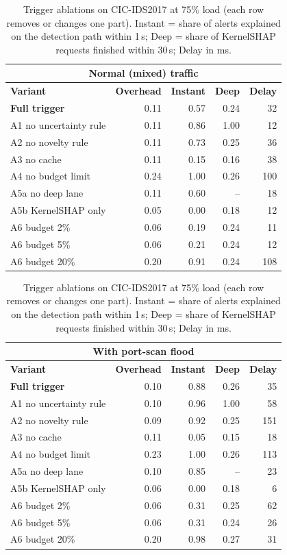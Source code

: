 \begin{table}[!htbp]
\centering
\caption{Trigger ablations on CIC-IDS2017 at 75\% load (each row removes or changes one part). Instant = share of alerts explained on the detection path within 1\,s; Deep = share of KernelSHAP requests finished within 30\,s; Delay in ms.}
\label{tab:abl}
\scriptsize
\setlength{\tabcolsep}{3pt}
\begin{minipage}[t]{0.495\textwidth}
\centering
\begin{tabular}{lrrrr}
\toprule
\multicolumn{5}{c}{\textbf{Normal (mixed) traffic}} \\
\midrule
\textbf{Variant} & \textbf{Overhead} & \textbf{Instant} & \textbf{Deep} & \textbf{Delay} \\
\midrule
\textbf{Full trigger} & 0.11 & 0.57 & 0.24 & 32 \\
A1 no uncertainty rule & 0.11 & 0.86 & 1.00 & 12 \\
A2 no novelty rule & 0.11 & 0.73 & 0.25 & 36 \\
A3 no cache & 0.11 & 0.15 & 0.16 & 38 \\
A4 no budget limit & 0.24 & 1.00 & 0.26 & 100 \\
A5a no deep lane & 0.11 & 0.60 & -- & 18 \\
A5b KernelSHAP only & 0.05 & 0.00 & 0.18 & 12 \\
A6 budget 2\% & 0.06 & 0.19 & 0.24 & 11 \\
A6 budget 5\% & 0.06 & 0.21 & 0.24 & 12 \\
A6 budget 20\% & 0.20 & 0.91 & 0.24 & 108 \\
\bottomrule
\end{tabular}
\end{minipage}
\hfill
\begin{minipage}[t]{0.495\textwidth}
\centering
\begin{tabular}{lrrrr}
\toprule
\multicolumn{5}{c}{\textbf{With port-scan flood}} \\
\midrule
\textbf{Variant} & \textbf{Overhead} & \textbf{Instant} & \textbf{Deep} & \textbf{Delay} \\
\midrule
\textbf{Full trigger} & 0.10 & 0.88 & 0.26 & 35 \\
A1 no uncertainty rule & 0.10 & 0.96 & 1.00 & 58 \\
A2 no novelty rule & 0.09 & 0.92 & 0.25 & 151 \\
A3 no cache & 0.11 & 0.05 & 0.15 & 18 \\
A4 no budget limit & 0.23 & 1.00 & 0.26 & 113 \\
A5a no deep lane & 0.10 & 0.85 & -- & 23 \\
A5b KernelSHAP only & 0.06 & 0.00 & 0.18 & 6 \\
A6 budget 2\% & 0.06 & 0.31 & 0.25 & 62 \\
A6 budget 5\% & 0.06 & 0.31 & 0.24 & 26 \\
A6 budget 20\% & 0.20 & 0.98 & 0.27 & 31 \\
\bottomrule
\end{tabular}
\end{minipage}
\end{table}

